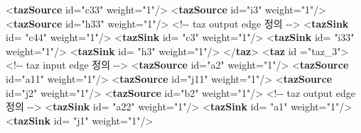 \documentclass[
  letterpaper,
  DIV=11,
  numbers=noendperiod]{scrreprt}
\newenvironment{Shaded}{\begin{snugshade}}{\end{snugshade}}
\newcommand{\CommentTok}[1]{\textcolor[rgb]{0.37,0.37,0.37}{#1}}
\newcommand{\KeywordTok}[1]{\textcolor[rgb]{0.00,0.23,0.31}{\textbf{#1}}}
\newcommand{\NormalTok}[1]{\textcolor[rgb]{0.00,0.23,0.31}{#1}}
\newcommand{\OtherTok}[1]{\textcolor[rgb]{0.00,0.23,0.31}{#1}}
\newcommand{\StringTok}[1]{\textcolor[rgb]{0.13,0.47,0.30}{#1}}
\begin{document}
\begin{Shaded}
\begin{Highlighting}[]
\NormalTok{        \textless{}}\KeywordTok{tazSource} \OtherTok{id=}\StringTok{"c33"} \OtherTok{weight=}\StringTok{"1"}\NormalTok{/\textgreater{}}
\NormalTok{        \textless{}}\KeywordTok{tazSource} \OtherTok{id=}\StringTok{"i3"} \OtherTok{weight=}\StringTok{"1"}\NormalTok{/\textgreater{}}
\NormalTok{        \textless{}}\KeywordTok{tazSource} \OtherTok{id=}\StringTok{"h33"} \OtherTok{weight=}\StringTok{"1"}\NormalTok{/\textgreater{}}
    \CommentTok{\textless{}!{-}{-} taz output edge 정의 {-}{-}\textgreater{}}
\NormalTok{        \textless{}}\KeywordTok{tazSink} \OtherTok{id=} \StringTok{"c44"} \OtherTok{weight=}\StringTok{"1"}\NormalTok{/\textgreater{}}
\NormalTok{        \textless{}}\KeywordTok{tazSink} \OtherTok{id=} \StringTok{"c3"} \OtherTok{weight=}\StringTok{"1"}\NormalTok{/\textgreater{}}
\NormalTok{        \textless{}}\KeywordTok{tazSink} \OtherTok{id=} \StringTok{"i33"} \OtherTok{weight=}\StringTok{"1"}\NormalTok{/\textgreater{}}
\NormalTok{        \textless{}}\KeywordTok{tazSink} \OtherTok{id=} \StringTok{"h3"} \OtherTok{weight=}\StringTok{"1"}\NormalTok{/\textgreater{}}
\NormalTok{    \textless{}/}\KeywordTok{taz}\NormalTok{\textgreater{}}
\NormalTok{    \textless{}}\KeywordTok{taz} \OtherTok{id} \OtherTok{=}\StringTok{"taz\_3"}\NormalTok{\textgreater{}}
    \CommentTok{\textless{}!{-}{-} taz input edge 정의 {-}{-}\textgreater{}}
\NormalTok{        \textless{}}\KeywordTok{tazSource} \OtherTok{id=}\StringTok{"a2"} \OtherTok{weight=}\StringTok{"1"}\NormalTok{/\textgreater{}}
\NormalTok{        \textless{}}\KeywordTok{tazSource} \OtherTok{id=}\StringTok{"a11"} \OtherTok{weight=}\StringTok{"1"}\NormalTok{/\textgreater{}}
\NormalTok{        \textless{}}\KeywordTok{tazSource} \OtherTok{id=}\StringTok{"j11"} \OtherTok{weight=}\StringTok{"1"}\NormalTok{/\textgreater{}}
\NormalTok{        \textless{}}\KeywordTok{tazSource} \OtherTok{id=}\StringTok{"j2"} \OtherTok{weight=}\StringTok{"1"}\NormalTok{/\textgreater{}}
\NormalTok{        \textless{}}\KeywordTok{tazSource} \OtherTok{id=}\StringTok{"b2"} \OtherTok{weight=}\StringTok{"1"}\NormalTok{/\textgreater{}}
    \CommentTok{\textless{}!{-}{-} taz output edge 정의 {-}{-}\textgreater{}}
\NormalTok{        \textless{}}\KeywordTok{tazSink} \OtherTok{id=} \StringTok{"a22"} \OtherTok{weight=}\StringTok{"1"}\NormalTok{/\textgreater{}}
\NormalTok{        \textless{}}\KeywordTok{tazSink} \OtherTok{id=} \StringTok{"a1"} \OtherTok{weight=}\StringTok{"1"}\NormalTok{/\textgreater{}}
\NormalTok{        \textless{}}\KeywordTok{tazSink} \OtherTok{id=} \StringTok{"j1"} \OtherTok{weight=}\StringTok{"1"}\NormalTok{/\textgreater{}}

\end{Highlighting}
\end{Shaded}
\end{document}

